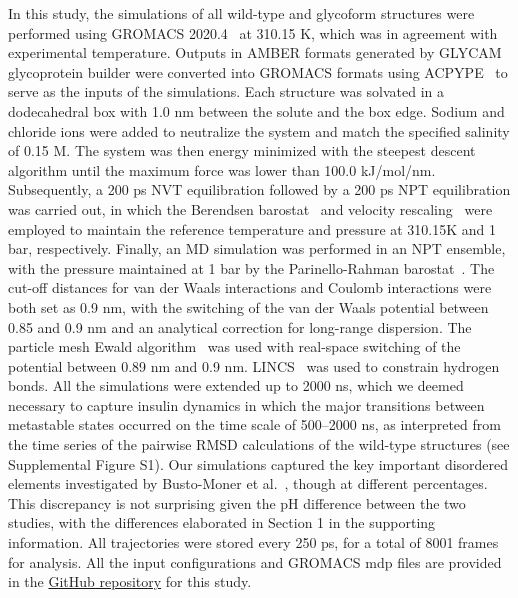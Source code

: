 \documentclass[9pt]{elife}
\begin{document}
In this study, the simulations of all wild-type and glycoform structures were performed using GROMACS 2020.4~\cite{abraham2015gromacs, pall2014tackling} at 310.15 K, which was in agreement with experimental temperature. Outputs in AMBER formats generated by GLYCAM glycoprotein builder were converted into GROMACS formats using ACPYPE~\cite{da2012acpype} to serve as the inputs of the simulations. Each structure was solvated in a dodecahedral box with 1.0 nm between the solute and the box edge. Sodium and chloride ions were added to neutralize the system and match the specified salinity of 0.15 M. The system was then energy minimized with the steepest descent algorithm until the maximum force was lower than 100.0 kJ/mol/nm. Subsequently, a 200 ps NVT equilibration followed by a 200 ps NPT equilibration was carried out, in which the Berendsen barostat~\cite{berendsen1984molecular} and velocity rescaling~\cite{bussi2007canonical} were employed to maintain the reference temperature and pressure at 310.15K and 1 bar, respectively. Finally, an MD simulation was performed in an NPT ensemble, with the pressure maintained at 1 bar by the Parinello-Rahman barostat~\cite{parrinello1980crystal, parrinello1981polymorphic}. The cut-off distances for van der Waals interactions and Coulomb interactions were both set as 0.9 nm, with the switching of the van der Waals potential between 0.85 and 0.9 nm and an analytical correction for long-range dispersion. The particle mesh Ewald algorithm~\cite{essmann1995smooth} was used with real-space switching of the potential between 0.89 nm and 0.9 nm. LINCS~\cite{lincs} was used to constrain hydrogen bonds. All the simulations were extended up to 2000 ns, which we deemed necessary to capture insulin dynamics in which the major transitions between metastable states occurred on the time scale of 500--2000 ns, as interpreted from the time series of the pairwise RMSD calculations of the wild-type structures (see Supplemental Figure S1).  Our simulations captured the key important disordered elements investigated by Busto-Moner et al.~\cite{busto2021structural},  though at different percentages. This discrepancy is not surprising given the pH difference between the two studies, with the differences elaborated in Section 1 in the supporting information.  All trajectories were stored every 250 ps, for a total of 8001 frames for analysis. All the input configurations and GROMACS mdp files are provided in the \href{https://github.com/shirtsgroup/Glycoinsulin_project}{GitHub repository} for this study.
\end{document}
